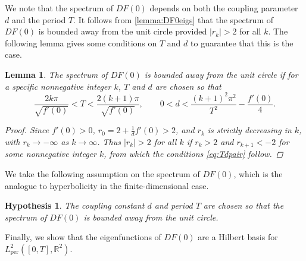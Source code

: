 \documentclass[12pt,reqno]{amsart}
\def\R{{\mathbb R}}
\def\per{\textrm{per}}
\newtheorem{lemma}{Lemma}
\newtheorem{hypothesis}{Hypothesis}
\begin{document}
We note that the spectrum of $DF(0)$ depends on both the coupling parameter $d$ and the period $T$. It follows from \cref{lemma:DF0eigs} that the spectrum of $DF(0)$ is bounded away from the unit circle provided $|r_k| > 2$ for all $k$. The following lemma gives some conditions on $T$ and $d$ to guarantee that this is the case.

\begin{lemma}\label{lemma:DF0hyp}
The spectrum of $DF(0)$ is bounded away from the unit circle if for a specific nonnegative integer $k$, $T$ and $d$ are chosen so that
\begin{equation}\label{eq:Tdpair}
\frac{2 k \pi}{\sqrt{f'(0)}} < T < \frac{2 (k+1) \pi}{\sqrt{f'(0)}} , \qquad 0 < d < \frac{(k+1)^2\pi^2}{T^2} - \frac{f'(0)}{4}.
\end{equation}
\begin{proof}
Since $f'(0) > 0$, $r_0 = 2 + \frac{1}{d}f'(0) > 2$, and $r_k$ is strictly decreasing in $k$, with $r_k \rightarrow -\infty$ as $k \rightarrow \infty$. Thus $|r_k| > 2$ for all $k$ if $r_k > 2$ and $r_{k+1} < -2$ for some nonnegative integer $k$, from which the conditions \cref{eq:Tdpair} follow.
\end{proof}
\end{lemma}

We take the following assumption on the spectrum of $DF(0)$, which is the analogue to hyperbolicity in the finite-dimensional case.

\begin{hypothesis}\label{hyp:hyp}
The coupling constant $d$ and period $T$ are chosen so that the spectrum of $DF(0)$ is bounded away from the unit circle.
\end{hypothesis}

Finally, we show that the eigenfunctions of $DF(0)$ are a Hilbert basis for $L^2_\per([0,T],\R^2)$.
\end{document}
